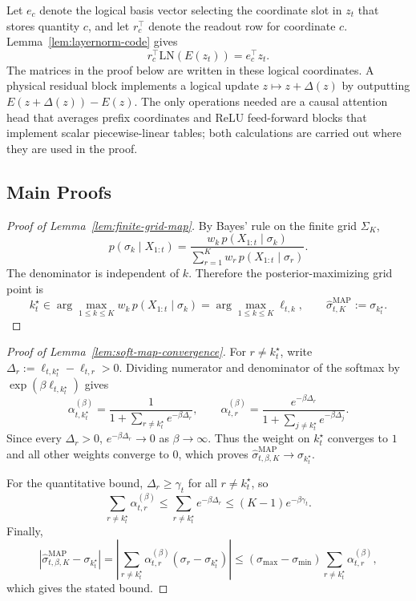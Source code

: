 \documentclass[11pt]{article}
\begin{document}
Let \(e_c\) denote the logical basis vector selecting the coordinate slot in \(z_t\) that stores quantity \(c\), and let \(r_c^\top\) denote the readout row for coordinate \(c\). Lemma~\ref{lem:layernorm-code} gives
\[
r_c^\top\mathrm{LN}(E(z_t))=e_c^\top z_t .
\]
The matrices in the proof below are written in these logical coordinates. A physical residual block implements a logical update \(z\mapsto z+\Delta(z)\) by outputting \(E(z+\Delta(z))-E(z)\). The only operations needed are a causal attention head that averages prefix coordinates and ReLU feed-forward blocks that implement scalar piecewise-linear tables; both calculations are carried out where they are used in the proof.

\subsection{Main Proofs}
\label{app:baseline-construction-proofs}

\begin{proof}[Proof of Lemma~\ref{lem:finite-grid-map}]
By Bayes' rule on the finite grid \(\Sigma_K\),
\[
p(\sigma_k\mid X_{1:t})
=
\frac{w_k\,p(X_{1:t}\mid\sigma_k)}
{\sum_{r=1}^K w_r\,p(X_{1:t}\mid\sigma_r)}.
\]
The denominator is independent of \(k\). Therefore the posterior-maximizing grid point is
\[
k_t^\star\in
\arg\max_{1\le k\le K} w_k\,p(X_{1:t}\mid\sigma_k)
=
\arg\max_{1\le k\le K}\ell_{t,k},
\qquad
\hat\sigma^{\mathrm{MAP}}_{t,K}:=\sigma_{k_t^\star}.
\]
\end{proof}

\begin{proof}[Proof of Lemma~\ref{lem:soft-map-convergence}]
For \(r\ne k_t^\star\), write \(\Delta_r:=\ell_{t,k_t^\star}-\ell_{t,r}>0\). Dividing numerator and denominator of the softmax by \(\exp(\beta\ell_{t,k_t^\star})\) gives
\[
\alpha_{t,k_t^\star}^{(\beta)}
=
\frac{1}{1+\sum_{r\ne k_t^\star}e^{-\beta\Delta_r}},
\qquad
\alpha_{t,r}^{(\beta)}
=
\frac{e^{-\beta\Delta_r}}{1+\sum_{j\ne k_t^\star}e^{-\beta\Delta_j}} .
\]
Since every \(\Delta_r>0\), \(e^{-\beta\Delta_r}\to0\) as \(\beta\to\infty\). Thus the weight on \(k_t^\star\) converges to \(1\) and all other weights converge to \(0\), which proves \(\hat\sigma^{\mathrm{MAP}}_{t,\beta,K}\to\sigma_{k_t^\star}\).

For the quantitative bound, \(\Delta_r\ge\gamma_t\) for all \(r\ne k_t^\star\), so
\[
\sum_{r\ne k_t^\star}\alpha_{t,r}^{(\beta)}
\le
\sum_{r\ne k_t^\star} e^{-\beta\Delta_r}
\le
(K-1)e^{-\beta\gamma_t}.
\]
Finally,
\[
\left|\hat\sigma^{\mathrm{MAP}}_{t,\beta,K}-\sigma_{k_t^\star}\right|
=
\left|\sum_{r\ne k_t^\star}\alpha_{t,r}^{(\beta)}(\sigma_r-\sigma_{k_t^\star})\right|
\le
(\sigma_{\max}-\sigma_{\min})\sum_{r\ne k_t^\star}\alpha_{t,r}^{(\beta)},
\]
which gives the stated bound.
\end{proof}
\end{document}

